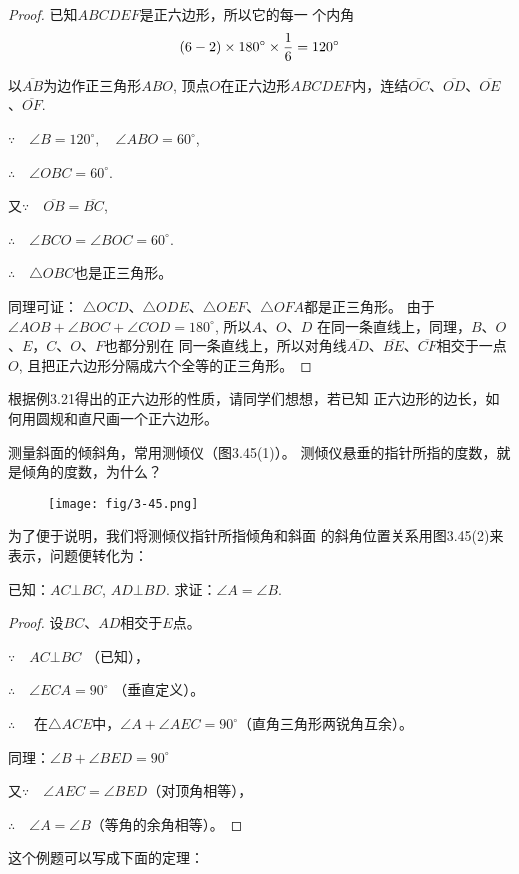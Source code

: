 \begin{proof}
    已知$ABCDEF$是正六边形，所以它的每一
    个内角
    \[(6-2)\times180^{\circ} \times\dfrac{1}{6}=120^{\circ}\]
    
    以$\overline{AB}$为边作正三角形$ABO$, 顶点$O$在正六边形$ABCD
    EF$内，连结$\overline{OC}$、$\overline{OD}$、$\overline{OE}$、$\overline{OF}$.

$\because\quad \angle B=120^{\circ},\quad \angle ABO=60^{\circ}$,
 
$\therefore\quad \angle OBC=60^{\circ}$.

又$\because\quad \overline{OB}=\overline{BC}$,

$\therefore\quad \angle BCO=\angle BOC=60^{\circ}$.

$\therefore\quad \triangle OBC$也是正三角形。

    同理可证：
$\triangle OCD$、$\triangle ODE$、$\triangle OEF$、$\triangle OFA$都是正三角形。
    由于$\angle AOB+\angle BOC+\angle COD=180^{\circ}$, 所以$A$、$O$、$D$
    在同一条直线上，同理，$B$、$O$、$E$，$C$、$O$、$F$也都分别在
    同一条直线上，所以对角线$\overline{AD}$、$\overline{BE}$、$\overline{CF}$相交于一点$O$, 
    且把正六边形分隔成六个全等的正三角形。
\end{proof}


    根据例3.21得出的正六边形的性质，请同学们想想，若已知
    正六边形的边长，如何用圆规和直尺画一个正六边形。
    


\begin{example}
    测量斜面的倾斜角，常用测倾仪（图3.45(1)）。
测倾仪悬垂的指针所指的度数，就是倾角的度数，为什么？
\begin{figure}[htp]
    \centering
\texttt{[image: fig/3-45.png]}
    \caption{}
\end{figure}
\end{example}


\begin{analyze}
    为了便于说明，我们将测倾仪指针所指倾角和斜面
    的斜角位置关系用图3.45(2)来表示，问题便转化为：

    已知：$AC\bot BC$, $AD\bot BD$. 求证：$\angle A=\angle B$.
\end{analyze}

\begin{proof}
    设$BC$、$AD$相交于$E$点。

$\because\quad AC\bot BC$  （已知），

$\therefore\quad \angle ECA=90^{\circ}$ （垂直定义）。

$\therefore\quad$ 在$\triangle ACE$中，$\angle A+\angle AEC=90^{\circ}$（直角三角形两锐角互余）。

同理：$\angle B+\angle BED=90^{\circ}$

又$\because\quad \angle AEC=\angle BED$（对顶角相等），

$\therefore\quad \angle A=\angle B$（等角的余角相等）。
\end{proof}
这个例题可以写成下面的定理：

